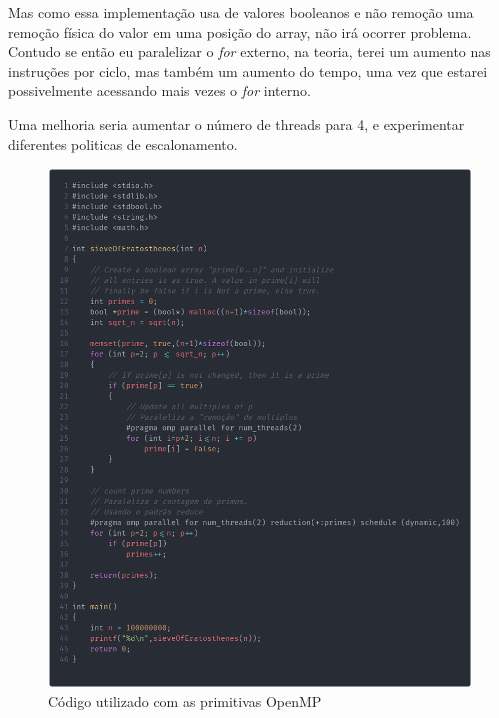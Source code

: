 \documentclass[a4paper,11pt,fleqn]{article}
\begin{document}
Mas como essa implementação usa de valores booleanos e não remoção uma
remoção física do valor em uma posição do array, não irá ocorrer problema.
Contudo se então eu paralelizar o \textit{for} externo, na teoria, terei um aumento nas instruções por ciclo, mas também um aumento do tempo, uma vez que estarei
possivelmente acessando mais vezes o \textit{for} interno.

Uma melhoria seria aumentar o número de threads para 4, e experimentar
diferentes politicas de escalonamento.

\newpage
\begin{figure}[h!]
    \caption{Código utilizado com as primitivas OpenMP}
    \centering
    \includegraphics[scale=0.56]{carbon}
\end{figure}
\end{document}
